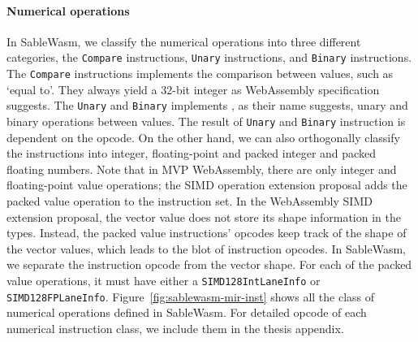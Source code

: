 \paragraph{Numerical operations} In SableWasm, we classify the numerical operations into three different categories, the \texttt{Compare} instructions, \texttt{Unary} instructions, and \texttt{Binary} instructions. The \texttt{Compare} instructions implements the comparison between values, such as `equal to'. They always yield a 32-bit integer as WebAssembly specification suggests. The \texttt{Unary} and \texttt{Binary} implements , as their name suggests, unary and binary operations between values. The result of \texttt{Unary} and \texttt{Binary} instruction is dependent on the opcode. On the other hand, we can also orthogonally classify the instructions into integer, floating-point and packed integer and packed floating numbers. Note that in MVP WebAssembly, there are only integer and floating-point value operations; the SIMD operation extension proposal adds the packed value operation to the instruction set. In the WebAssembly SIMD extension proposal, the vector value does not store its shape information in the types. Instead, the packed value instructions' opcodes keep track of the shape of the vector values, which leads to the blot of instruction opcodes. In SableWasm, we separate the instruction opcode from the vector shape. For each of the packed value operations, it must have either a \texttt{SIMD128IntLaneInfo} or \texttt{SIMD128FPLaneInfo}. Figure~\ref{fig:sablewasm-mir-inst} shows all the class of numerical operations defined in SableWasm. For detailed opcode of each numerical instruction class, we include them in the thesis appendix.

